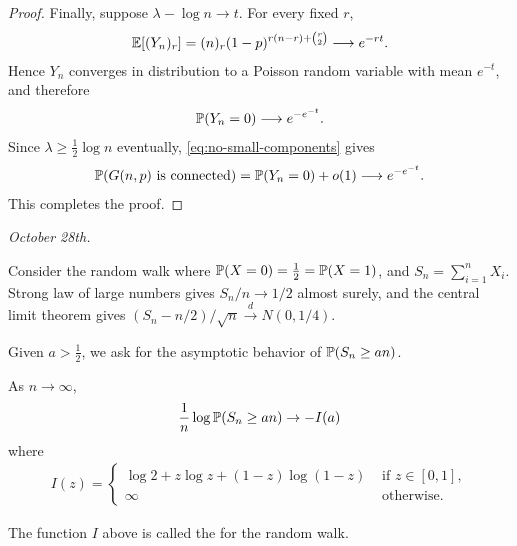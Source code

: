 \begin{proof}
    Finally, suppose $\lambda-\log n\to t$. For every fixed $r$,
    \begin{align}
        \mathbb{E}[(Y_n)_r]
        =(n)_r(1-p)^{r(n-r)+\binom r2}\longrightarrow e^{-rt}.
    \end{align}
    Hence $Y_n$ converges in distribution to a Poisson random variable with
    mean $e^{-t}$, and therefore
    \begin{align}
        \mathbb{P}(Y_n=0)\longrightarrow e^{-e^{-t}}.
    \end{align}
    Since $\lambda\geq\frac12\log n$ eventually, \eqref{eq:no-small-components}
    gives
    \begin{align}
        \mathbb{P}(G(n,p)\text{ is connected})
        =\mathbb{P}(Y_n=0)+o(1)\longrightarrow e^{-e^{-t}}.
    \end{align}
    This completes the proof.
\end{proof}

\textit{October 28th.}

\begin{example}
    Consider the random walk where $\mathbb{P}(X=0) = \frac{1}{2} = \mathbb{P}(X=1)$, and $S_{n} = \sum_{i=1}^{n}X_{i}$. Strong law of large numbers gives $S_{n}/n \to 1/2$ almost surely, and the central limit theorem gives $(S_{n}-n/2)/\sqrt{n} \xrightarrow{d} N(0,1/4)$.
\end{example}

Given $a > \frac{1}{2}$, we ask for the asymptotic behavior of $\mathbb{P}(S_{n} \geq an)$.

\begin{theorem}
    As $n \to \infty$,
    \begin{align}
        \frac{1}{n} \log \mathbb{P}(S_{n} \geq an) \to -I(a)
    \end{align}
    where
    \begin{align}
        I(z) = \begin{cases}
            \log 2 + z \log z + (1-z)\log(1-z) &\text{ if } z \in [0,1],\\
            \infty &\text{ otherwise.}
        \end{cases}
    \end{align}
\end{theorem}

The function $I$ above is called the  for the random walk.

